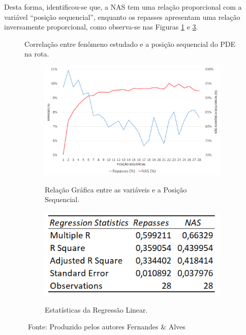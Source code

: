 Desta forma, identificou-se que, a NAS tem uma relação proporcional com a variável ``posição sequencial'', enquanto os repasses apresentam uma relação inversamente proporcional, como observa-se nas Figuras \ref{fig:PosicaoSequencial} e \ref{fig:PosicaoSequencialRS}.

\begin{figure}[H]
    \caption{Correlação entre fenômeno estudado e a posição sequencial do PDE na rota.}
    \begin{subfigure}{.64\textwidth}
        \centering
        \caption{Relação Gráfica entre as variáveis e a Posição Sequencial.}
        \includegraphics[width=.98\linewidth]{images/5_emp_bebidas/excel_based/PosicaoSequencial.png}
        \label{fig:PosicaoSequencial}
    \end{subfigure}
    \begin{subfigure}{.35\textwidth}
      \centering
      \caption{Estatísticas da Regressão Linear.}
      \includegraphics[width=.88\linewidth]{images/5_emp_bebidas/excel_based/PosicaoSequencial_RS.png}
      \label{fig:PosicaoSequencialRS}
    \end{subfigure}
    \caption*{\ Fonte: Produzido pelos autores Fernandes \& Alves}
\end{figure} %

